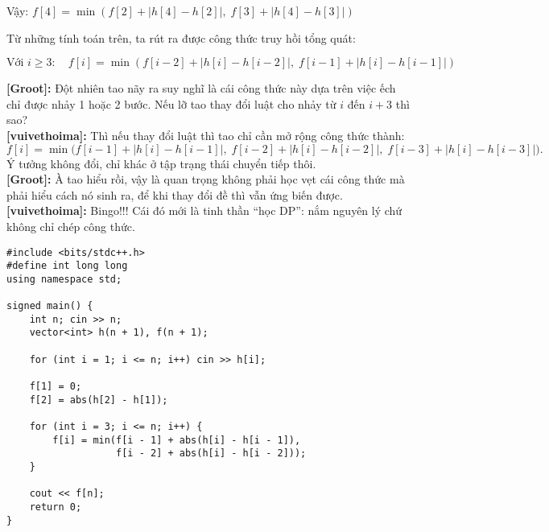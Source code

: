 Vậy: $ f[4] = \min \left( f[2] + |h[4] - h[2]|, \; f[3] + |h[4] - h[3]| \right) $


Từ những tính toán trên, ta rút ra được công thức truy hồi tổng quát:

\[
\text{Với } i \geq 3: \quad f[i] = \min \left( f[i - 2] + |h[i] - h[i-2]|, \; f[i - 1] + |h[i] - h[i-1]| \right)
\]


\textbf{[Groot]:} Đột nhiên tao nãy ra suy nghĩ là cái công thức này dựa trên việc ếch chỉ được nhảy 1 hoặc 2 bước. Nếu lỡ tao thay đổi luật cho nhảy từ $i$ đến $i + 3$ thì sao?\\

\textbf{[vuivethoima]:} Thì nếu thay đổi luật thì tao chỉ cần mở rộng công thức thành:
\[
f[i] = \min \Big( 
    f[i-1] + |h[i] - h[i-1]|,\;
    f[i-2] + |h[i] - h[i-2]|,\;
    f[i-3] + |h[i] - h[i-3]|
\Big).
\]
Ý tưởng không đổi, chỉ khác ở tập trạng thái chuyển tiếp thôi.\\

\textbf{[Groot]:} À tao hiểu rồi, vậy là quan trọng không phải học vẹt cái công thức mà phải hiểu cách nó sinh ra, để khi thay đổi đề thì vẫn ứng biến được.\\

\textbf{[vuivethoima]:} Bingo!!! Cái đó mới là tinh thần ``học DP'': nắm nguyên lý chứ không chỉ chép công thức. 

\begin{lstlisting}[title=\centering \textbf{Cài đặt}]
#include <bits/stdc++.h>
#define int long long
using namespace std;

signed main() {
    int n; cin >> n;
    vector<int> h(n + 1), f(n + 1);

    for (int i = 1; i <= n; i++) cin >> h[i];

    f[1] = 0;
    f[2] = abs(h[2] - h[1]);

    for (int i = 3; i <= n; i++) {
        f[i] = min(f[i - 1] + abs(h[i] - h[i - 1]),
                   f[i - 2] + abs(h[i] - h[i - 2]));
    }

    cout << f[n];
    return 0;
}
\end{lstlisting}

